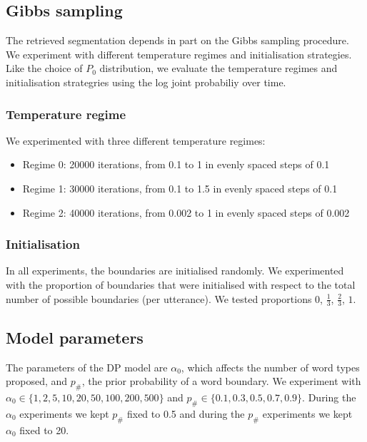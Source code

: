 \subsection{Gibbs sampling}

The retrieved segmentation depends in part on the Gibbs sampling procedure. We experiment with different temperature regimes and initialisation strategies. Like the choice of $P_0$ distribution, we evaluate the temperature regimes and initialisation strategries using the log joint probabiliy over time.

\subsubsection{Temperature regime}

We experimented with three different temperature regimes:

\begin{itemize}
\item Regime 0: 20000 iterations, from 0.1 to 1 in evenly spaced steps of 0.1
\item Regime 1: 30000 iterations, from 0.1 to 1.5 in evenly spaced steps of 0.1
\item Regime 2: 40000 iterations, from 0.002 to 1 in evenly spaced steps of 0.002
\end{itemize}

\subsubsection{Initialisation}

In all experiments, the boundaries are initialised randomly. We experimented with the proportion of boundaries that were initialised with respect to the total number of possible boundaries (per utterance). We tested proportions $0$, $\frac{1}{3}$, $\frac{2}{3}$, $1$.

\subsection{Model parameters}

The parameters of the DP model are $\alpha_0$, which affects the number of word types proposed, and $p_\#$, the prior probability of a word boundary. We experiment with $\alpha_0 \in \{1, 2, 5, 10, 20, 50, 100, 200, 500\}$ and $p_\# \in \{0.1, 0.3, 0.5, 0.7, 0.9\}$. During the $\alpha_0$ experiments we kept $p_\#$ fixed to 0.5 and during the $p_\#$ experiments we kept $\alpha_0$ fixed to 20.

